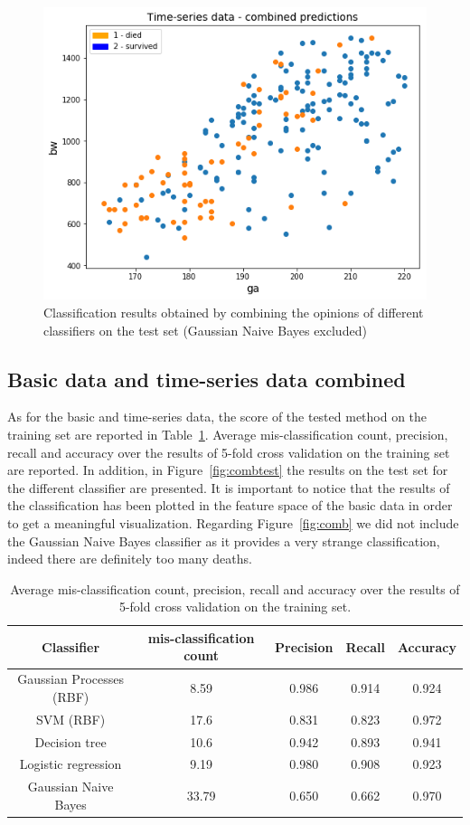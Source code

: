 \documentclass[a4paper,11pt]{article}
\begin{document}
\begin{figure}[H]
    \centering
    \includegraphics[width=0.7\linewidth]{ts_combined.png}
    \caption{Classification results obtained by combining the opinions of different classifiers on the test set (Gaussian Naive Bayes excluded)}
    \label{fig:tscomb}
\end{figure}

\subsection{Basic data and time-series data combined}\label{sec:res_comb_data}
As for the basic and time-series data, the score of the tested method on the training set are reported in Table~\ref{tab:combscores}. Average mis-classification count, precision, recall and accuracy over the results of 5-fold cross validation on the training set are reported. In addition, in Figure~\ref{fig:combtest} the results on the test set for the different classifier are presented. It is important to notice that the results of the classification has been plotted in the feature space of the basic data in order to get a meaningful visualization. Regarding Figure~\ref{fig:comb} we did not include the Gaussian Naive Bayes classifier as it provides a very strange classification, indeed there are definitely too many deaths.

\begin{table}[H]
    \centering
    \begin{tabular}{|c|c|c|c|c|}
    \hline
        Classifier & mis-classification count & Precision & Recall & Accuracy \\
    \hline
        Gaussian Processes (RBF)& 8.59  & 0.986 & 0.914 & 0.924\\
        SVM (RBF)               & 17.6  & 0.831 & 0.823 & 0.972\\
        Decision tree           & 10.6  & 0.942 & 0.893 & 0.941\\
        Logistic regression     & 9.19  & 0.980 & 0.908 & 0.923\\
        Gaussian Naive Bayes    & 33.79 & 0.650 & 0.662 & 0.970\\
    \hline
    \end{tabular}
    \caption{Average mis-classification count, precision, recall and accuracy over the results of 5-fold cross validation on the training set.}
    \label{tab:combscores}
\end{table}
\end{document}
